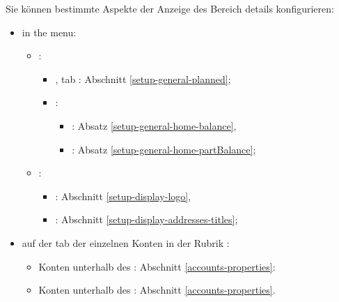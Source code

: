 Sie können bestimmte Aspekte der Anzeige des Bereich details konfigurieren:%
\begin{itemize}
	\item in the  menu: %
	\begin{itemize}
		\item {}:
		\begin{itemize}%
			\item {}, tab : Abschnitt \vref{setup-general-planned};
			\item {}:
			\begin{itemize}%
				\item {}: Absatz \vref{setup-general-home-balance},
				\item {}: Absatz \vref{setup-general-home-partBalance};
			\end{itemize}
		\end{itemize}
		\item {}:
		\begin{itemize}[label=-]
			\item {}: Abschnitt \vref{setup-display-logo},
			\item {}: Abschnitt \vref{setup-display-addresses-titles};
		\end{itemize}
	\end{itemize}
	\item auf der tab  der einzelnen Konten in der Rubrik :%
	\begin{itemize}
		\item Konten unterhalb des : Abschnitt \vref{accounts-properties}:
		\item Konten unterhalb des : Abschnitt  \vref{accounts-properties}.
	\end{itemize}
\end{itemize}


